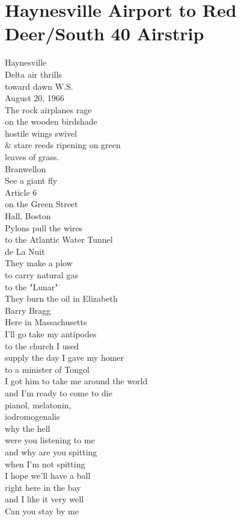 \documentclass[smalldemyvopaper,11pt,twoside,onecolumn,openright,extrafontsizes]{memoir}
\begin{document}
\chapter{Haynesville Airport to Red Deer/South 40 Airstrip}
Haynesville
\\Delta air thrills
\\toward dawn W.S.
\\August 20, 1966
\\The rock airplanes rage
\\on the wooden birdshade
\\hostile wings swivel
\\\& stare reeds ripening on green
\\leaves of grass.
\\Branwellon
\\See a giant fly
\\Article 6
\\on the Green Street
\\Hall, Boston
\\Pylons pull the wires
\\to the Atlantic Water Tunnel
\\de La Nuit
\\They make a plow
\\to carry natural gas
\\to the "Lunar"
\\They burn the oil in Elizabeth
\\Barry Bragg
\\Here in Massachusetts
\\I'll go take my antipodes
\\to the church I used
\\supply the day I gave my homer
\\to a minister of Tongol
\\I got him to take me around the world
\\and I'm ready to come to die
\\pianol, melatonin,
\\iodromogenalis
\\why the hell
\\were you listening to me
\\and why are you spitting
\\when I'm not spitting
\\I hope we'll have a ball
\\right here in the bay
\\and I like it very well
\\Can you stay by me
\end{document}
